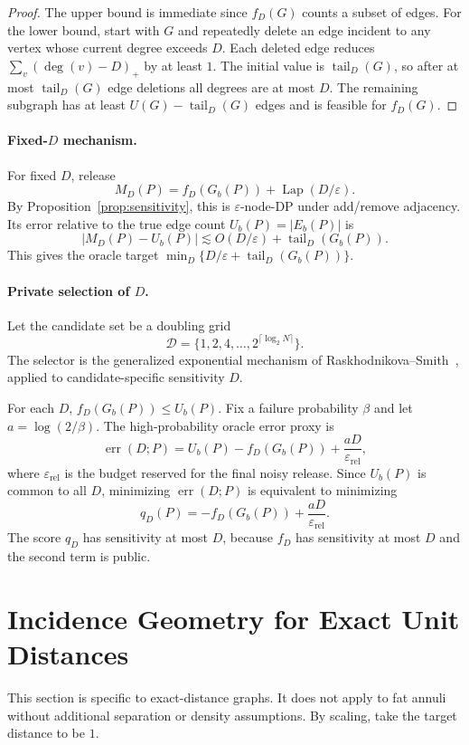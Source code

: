 \documentclass[11pt]{article}
\DeclareMathOperator{\Lap}{Lap}
\newcommand{\eps}{\varepsilon}
\newcommand{\calD}{\mathcal{D}}
\newcommand{\tail}{\operatorname{tail}}
\begin{document}
\begin{proof}
The upper bound is immediate since \(f_D(G)\) counts a subset of edges. For the lower bound, start with \(G\) and repeatedly delete an edge incident to any vertex whose current degree exceeds \(D\). Each deleted edge reduces \(\sum_v(\deg(v)-D)_+\) by at least \(1\). The initial value is \(\tail_D(G)\), so after at most \(\tail_D(G)\) edge deletions all degrees are at most \(D\). The remaining subgraph has at least \(U(G)-\tail_D(G)\) edges and is feasible for \(f_D(G)\).
\end{proof}

\paragraph{Fixed-\(D\) mechanism.}
For fixed \(D\), release
\[
M_D(P)=f_D(G_b(P))+\Lap(D/\eps).
\]
By Proposition~\ref{prop:sensitivity}, this is \(\eps\)-node-DP under add/remove adjacency. Its error relative to the true edge count \(U_b(P)=|E_b(P)|\) is
\[
|M_D(P)-U_b(P)|\lesssim O(D/\eps)+\tail_D(G_b(P)).
\]
This gives the oracle target \(\min_D\{D/\eps+\tail_D(G_b(P))\}\).

\paragraph{Private selection of \(D\).}
Let the candidate set be a doubling grid
\[
\calD=\{1,2,4,\ldots,2^{\lceil\log_2 N\rceil}\}.
\]
The selector is the generalized exponential mechanism of Raskhodnikova--Smith~\cite[Theorem~1.4]{RS16}, applied to candidate-specific sensitivity \(D\).

For each \(D\), \(f_D(G_b(P))\le U_b(P)\). Fix a failure probability \(\beta\) and let \(a=\log(2/\beta)\). The high-probability oracle error proxy is
\[
\operatorname{err}(D;P)=U_b(P)-f_D(G_b(P))+\frac{aD}{\eps_{\mathrm{rel}}},
\]
where \(\eps_{\mathrm{rel}}\) is the budget reserved for the final noisy release. Since \(U_b(P)\) is common to all \(D\), minimizing \(\operatorname{err}(D;P)\) is equivalent to minimizing
\[
q_D(P)=-f_D(G_b(P))+\frac{aD}{\eps_{\mathrm{rel}}}.
\]
The score \(q_D\) has sensitivity at most \(D\), because \(f_D\) has sensitivity at most \(D\) and the second term is public.

\section{Incidence Geometry for Exact Unit Distances}

This section is specific to exact-distance graphs. It does not apply to fat annuli without additional separation or density assumptions. By scaling, take the target distance to be \(1\).
\end{document}
